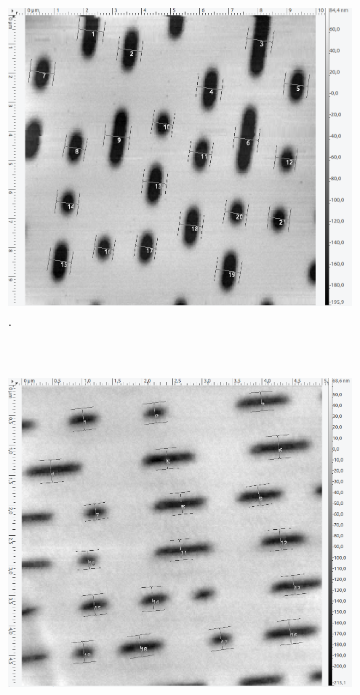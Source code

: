 \begin{figure}[H]
\centering
	\begin{subfigure}[t]{0.3\textwidth}
	\includegraphics[width=\textwidth]{AFM_auswertung/cd_tiefe.png}
	\caption{.}
	\label{abb:}
	\end{subfigure}
	~
	\begin{subfigure}[t]{0.3\textwidth}
	\includegraphics[width=\textwidth]{AFM_auswertung/dvd_tiefe.png}

\end{subfigure}
\end{figure}
